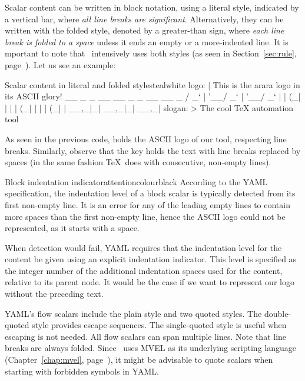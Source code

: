 Scalar content can be written in block notation, using a literal style, indicated by a vertical bar, where \emph{all line breaks are significant}. Alternatively, they can be written with the folded style, denoted by a greater-than sign, where \emph{each line break is folded to a space} unless it ends an empty or a more-indented line. It is mportant to note that \arara\ intensively uses both styles (as seen in Section~\ref{sec:rule}, page~\pageref{sec:rule}). Let us see an example:

\begin{codebox}{Scalar content in literal and folded styles}{teal}{\icnote}{white}
logo: |
  This is the arara logo
  in its ASCII glory! 
    __ _ _ __ __ _ _ __ __ _ 
   / _` | '__/ _` | '__/ _` |
  | (_| | | | (_| | | | (_| |
   \__,_|_|  \__,_|_|  \__,_|
slogan: >
  The cool TeX
  automation tool
\end{codebox}

As seen in the previous code,  holds the ASCII logo of our tool, respecting line breaks. Similarly, observe that the  key holds the text with line breaks replaced by spaces (in the same fashion \TeX\ does with consecutive, non-empty lines).

\begin{messagebox}{Block indentation indicator}{attentioncolour}{\icattention}{black}
\setlength{\parskip}{1em}
According to the YAML specification, the indentation level of a block scalar is typically detected from its first non-empty line. It is an error for any of the leading empty lines to contain more spaces than the first non-empty line, hence the ASCII logo could not be represented, as it starts with a space.

When detection would fail, YAML requires that the indentation level for the content be given using an explicit indentation indicator. This level is specified as the integer number of the additional indentation spaces used for the content, relative to its parent node. It would be the case if we want to represent our logo without the preceding text.
\end{messagebox}

YAML's flow scalars include the plain style and two quoted styles. The double-quoted style provides escape sequences. The single-quoted style is useful when escaping is not needed. All flow scalars can span multiple lines. Note that line breaks are always folded. Since \arara\ uses MVEL as its underlying scripting language (Chapter~\ref{chap:mvel}, page~\pageref{chap:mvel}), it might be advisable to quote scalars when starting with forbidden symbols in YAML.


